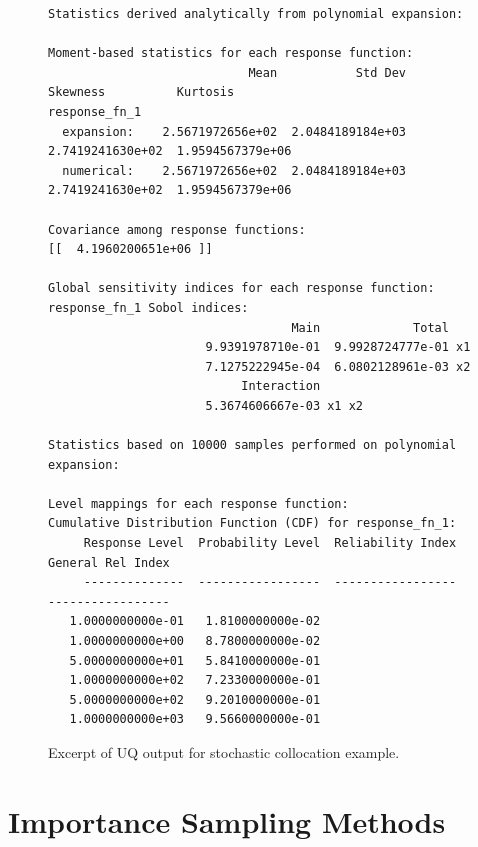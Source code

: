 \begin{figure}[htbp!]
\centering
\begin{bigbox}
\begin{footnotesize}
\begin{verbatim}
Statistics derived analytically from polynomial expansion:

Moment-based statistics for each response function:
                            Mean           Std Dev          Skewness          Kurtosis
response_fn_1
  expansion:    2.5671972656e+02  2.0484189184e+03  2.7419241630e+02  1.9594567379e+06
  numerical:    2.5671972656e+02  2.0484189184e+03  2.7419241630e+02  1.9594567379e+06

Covariance among response functions:
[[  4.1960200651e+06 ]] 

Global sensitivity indices for each response function:
response_fn_1 Sobol indices:
                                  Main             Total
                      9.9391978710e-01  9.9928724777e-01 x1
                      7.1275222945e-04  6.0802128961e-03 x2
                           Interaction
                      5.3674606667e-03 x1 x2 

Statistics based on 10000 samples performed on polynomial expansion:

Level mappings for each response function:
Cumulative Distribution Function (CDF) for response_fn_1:
     Response Level  Probability Level  Reliability Index  General Rel Index
     --------------  -----------------  -----------------  -----------------
   1.0000000000e-01   1.8100000000e-02
   1.0000000000e+00   8.7800000000e-02
   5.0000000000e+01   5.8410000000e-01
   1.0000000000e+02   7.2330000000e-01
   5.0000000000e+02   9.2010000000e-01
   1.0000000000e+03   9.5660000000e-01
\end{verbatim}
\end{footnotesize}
\end{bigbox}
\caption{Excerpt of UQ output for stochastic collocation example.}
\label{uq:figure12}
\end{figure}

\section{Importance Sampling Methods}\label{uq:importance}

